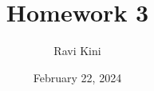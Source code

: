 \documentclass{article}
\title{Homework 3}
\author{Ravi Kini}
\date{February 22, 2024}
\begin{document}
\maketitle

\problem

\clearpage

\problem

\clearpage

\problem

\clearpage

\problem

\clearpage

\problem

\clearpage

\problem

\clearpage

\problem

\clearpage

\problem

\clearpage

\problem

\clearpage

\problem

\clearpage

\problem
\end{document}
